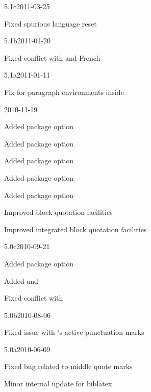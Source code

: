 \documentclass{ltxdockit}[2010/09/26]
\begin{document}
\begin{changelog}
\begin{release}{5.1c}{2011-03-25}
\item Fixed spurious language reset
\end{release}

\begin{release}{5.1b}{2011-01-20}
\item Fixed conflict with  and French
\end{release}

\begin{release}{5.1a}{2011-01-11}
\item Fix for paragraph environments inside 
\end{release}

\begin{release}{5.1}{2010-11-19}
\item Added package option 
\item Added package option 
\item Added package option 
\item Added package option 
\item Added package option 
\item Improved block quotation facilities
\item Improved integrated block quotation facilities
\end{release}

\begin{release}{5.0c}{2010-09-21}
\item Added package option 
\item Added  and 
\item Fixed conflict with 
\end{release}

\begin{release}{5.0b}{2010-08-06}
\item Fixed issue with 's active punctuation marks
\end{release}

\begin{release}{5.0a}{2010-06-09}
\item Fixed bug related to middle quote marks
\item Minor internal update for biblatex
\end{release}


\end{changelog}
\end{document}
